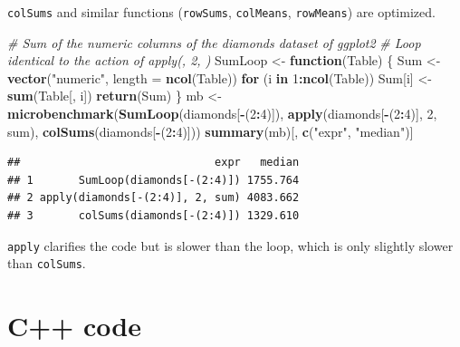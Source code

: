 \documentclass[
  12pt,
  american,
  a4paper,
  extrafontsizes,onecolumn,openright
  ]{memoir}
\newenvironment{Shaded}{\begin{snugshade}}{\end{snugshade}}
\newcommand{\AttributeTok}[1]{\textcolor[rgb]{0.13,0.29,0.53}{#1}}
\newcommand{\CommentTok}[1]{\textcolor[rgb]{0.56,0.35,0.01}{\textit{#1}}}
\newcommand{\ControlFlowTok}[1]{\textcolor[rgb]{0.13,0.29,0.53}{\textbf{#1}}}
\newcommand{\DecValTok}[1]{\textcolor[rgb]{0.00,0.00,0.81}{#1}}
\newcommand{\FunctionTok}[1]{\textcolor[rgb]{0.13,0.29,0.53}{\textbf{#1}}}
\newcommand{\NormalTok}[1]{#1}
\newcommand{\OtherTok}[1]{\textcolor[rgb]{0.56,0.35,0.01}{#1}}
\newcommand{\SpecialCharTok}[1]{\textcolor[rgb]{0.81,0.36,0.00}{\textbf{#1}}}
\newcommand{\StringTok}[1]{\textcolor[rgb]{0.31,0.60,0.02}{#1}}
\begin{document}
\texttt{colSums} and similar functions (\texttt{rowSums}, \texttt{colMeans}, \texttt{rowMeans}) are optimized.

\scriptsize

\begin{Shaded}
\begin{Highlighting}[]
\CommentTok{\# Sum of the numeric columns of the diamonds dataset of ggplot2}
\CommentTok{\# Loop identical to the action of apply(, 2, )}
\NormalTok{SumLoop }\OtherTok{\textless{}{-}} \ControlFlowTok{function}\NormalTok{(Table) \{}
\NormalTok{  Sum }\OtherTok{\textless{}{-}} \FunctionTok{vector}\NormalTok{(}\StringTok{"numeric"}\NormalTok{, }\AttributeTok{length =} \FunctionTok{ncol}\NormalTok{(Table))}
  \ControlFlowTok{for}\NormalTok{ (i }\ControlFlowTok{in} \DecValTok{1}\SpecialCharTok{:}\FunctionTok{ncol}\NormalTok{(Table)) Sum[i] }\OtherTok{\textless{}{-}} \FunctionTok{sum}\NormalTok{(Table[, i])}
  \FunctionTok{return}\NormalTok{(Sum)}
\NormalTok{\}}
\NormalTok{mb }\OtherTok{\textless{}{-}} \FunctionTok{microbenchmark}\NormalTok{(}\FunctionTok{SumLoop}\NormalTok{(diamonds[}\SpecialCharTok{{-}}\NormalTok{(}\DecValTok{2}\SpecialCharTok{:}\DecValTok{4}\NormalTok{)]), }
                     \FunctionTok{apply}\NormalTok{(diamonds[}\SpecialCharTok{{-}}\NormalTok{(}\DecValTok{2}\SpecialCharTok{:}\DecValTok{4}\NormalTok{)], }\DecValTok{2}\NormalTok{, sum), }
                     \FunctionTok{colSums}\NormalTok{(diamonds[}\SpecialCharTok{{-}}\NormalTok{(}\DecValTok{2}\SpecialCharTok{:}\DecValTok{4}\NormalTok{)]))}
\FunctionTok{summary}\NormalTok{(mb)[, }\FunctionTok{c}\NormalTok{(}\StringTok{"expr"}\NormalTok{, }\StringTok{"median"}\NormalTok{)]}
\end{Highlighting}
\end{Shaded}

\begin{verbatim}
##                              expr   median
## 1       SumLoop(diamonds[-(2:4)]) 1755.764
## 2 apply(diamonds[-(2:4)], 2, sum) 4083.662
## 3       colSums(diamonds[-(2:4)]) 1329.610
\end{verbatim}

\normalsize

\texttt{apply} clarifies the code but is slower than the loop, which is only slightly slower than \texttt{colSums}.

\section{C++ code}\label{sec:cpp}
\end{document}
